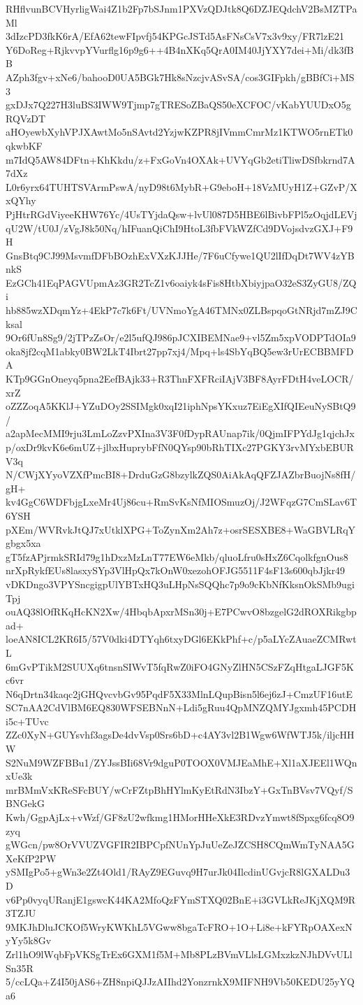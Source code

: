 RHflvunBCVHyrligWai4Z1b2Fp7bSJnm1PXVzQDJtk8Q6DZJEQdchV2BsMZTPaMl
3dIzcPD3fkK6rA/EfA62tewFIpvfj54KPGcJSTd5AsFNsCsV7x3v9xy/FR7lzE21
Y6DoReg+RjkvvpYVurflg16p9g6++4B4nXKq5QrA0IM40JjYXY7dei+Mi/dk3fBB
AZph3fgv+xNe6/bahooD0UA5BGk7Hk8sNzcjvASvSA/cos3GIFpkh/gBBfCi+MS3
gxDJx7Q227H3luBS3IWW9Tjmp7gTRESoZBaQS50eXCFOC/vKabYUUDxO5gRQVzDT
aHOyewbXyhVPJXAwtMo5nSAvtd2YzjwKZPR8jIVmmCmrMz1KTWO5rnETk0qkwbKF
m7IdQ5AW84DFtn+KhKkdu/z+FxGoVn4OXAk+UVYqGb2etiTliwDSfbkrnd7A7dXz
L0r6yrx64TUHTSVArmPswA/nyD98t6MybR+G9eboH+18VzMUyH1Z+GZvP/XxQYhy
PjHtrRGdViyeeKHW76Yc/4UsTYjdaQsw+lvUl087D5HBE6lBivbFPl5zOqjdLEVj
qU2W/tU0J/zVgJ8k50Nq/hIFuanQiChI9HtoL3fbFVkWZfCd9DVojsdvzGXJ+F9H
GnsBtq9CJ99MsvmfDFbBOzhExVXzKJJHe/7F6uCfywe1QU2lIfDqDt7WV4zYBnkS
EzGCh41EqPAGVUpmAz3GR2TcZ1v6oaiyk4sFis8HtbXbiyjpaO32eS3ZyGU8/ZQi
hb885wzXDqmYz+4EkP7c7k6Ft/UVNmoYgA46TMNx0ZLBspqoGtNRjd7mZJ9Cksal
9Or6fUn8Sg9/2jTPzZsOr/e2l5ufQJ986pJCXIBEMNae9+vl5Zm5xpVODPTdOIa9
oka8jf2cqM1abky0BW2LkT4Ibrt27pp7xj4/Mpq+ls4SbYqBQ5ew3rUrECBBMFDA
KTp9GGnOneyq5pna2EefBAjk33+R3ThnFXFRciIAjV3BF8AyrFDtH4veLOCR/xrZ
oZZZoqA5KKlJ+YZuDOy2SSIMgk0xqI21iphNpsYKxuz7EiEgXIfQIEeuNySBtQ9/
a2apMecMMI9rju3LmLoZzvPXIna3V3F0fDypRAUnap7ik/0QjmIFPYdJg1qjchJx
p/oxDr9kvK6e6mUZ+jlbxHuprybFfN0QYsp90bRhTIXc27PGKY3rvMYxbEBURV3q
N/CWjXYyoVZXfPmcBI8+DrduGzG8bzylkZQS0AiAkAqQFZJAZbrBuojNs8fH/gH+
kv4GgC6WDFbjgLxeMr4Uj86cu+RmSvKsNfMIOSmuzOj/J2WFqzG7CmSLav6T6YSH
pXEm/WVRvkJtQJ7xUtklXPG+ToZynXm2Ah7z+osrSESXBE8+WaGBVLRqYgbgx5xa
gT5fzAPjrmkSRId79g1hDxzMzLnT77EW6eMkb/qluoLfru0sHxZ6CqolkfgnOus8
nrXpRykfEUs8lasxySYp3VlHpQx7kOnW0xezohOFJG5511F4sF13s600qbJjkr49
vDKDngo3VPYSncgigpUlYBTxHQ3uLHpNsSQQhc7p9o9cKbNfKksnOkSMb9ugiTpj
ouAQ38lOfRKqHcKN2Xw/4HbqbApxrMSn30j+E7PCwvO8bzgelG2dROXRikgbpad+
loeAN8ICL2KR6I5/57V0dki4DTYqh6txyDGl6EKkPhf+c/p5aLYcZAuaeZCMRwtL
6mGvPTikM2SUUXq6tnsnSIWvT5fqRwZ0iFO4GNyZlHN5CSzFZqHtgaLJGF5Kc6vr
N6qDrtn34kaqc2jGHQvcvbGv95PqdF5X33MlnLQupBisn5l6ej6zJ+CmzUF16utE
SC7nAA2CdVlBM6EQ830WFSEBNnN+Ldi5gRuu4QpMNZQMYJgxmh45PCDHi5c+TUvc
ZZc0XyN+GUYsvhf3agsDe4dvVsp0Srs6bD+c4AY3vl2B1Wgw6WfWTJ5k/iljcHHW
S2NuM9WZFBBu1/ZYJssBIi68Vr9dguP0TOOX0VMJEaMhE+Xl1aXJEEl1WQnxUe3k
mrBMmVxKReSFcBUY/wCrFZtpBhHYlmKyEtRdN3IbzY+GxTnBVsv7VQyf/SBNGekG
Kwh/GgpAjLx+vWzf/GF8zU2wfkmg1HMorHHeXkE3RDvzYmwt8fSpxg6fcq8O9zyq
gWGcn/pw8OrVVUZVGFIR2IBPCpfNUnYpJuUeZeJZCSH8CQmWmTyNAA5GXeKfP2PW
ySMIgPo5+gWn3e2Zt4Old1/RAyZ9EGuvq9H7urJk04IlcdinUGvjcR8lGXALDu3D
v6Pp0vyqURanjE1gswcK44KA2MfoQzFYmSTXQ02BnE+i3GVLkReJKjXQM9R3TZJU
9MKJhDluJCKOf5WryKWKhL5VGww8bgaTcFRO+1O+Li8e+kFYRpOAXexNyYy5k8Gv
Zrl1hO9lWqbFpVKSgTrEx6GXM1f5M+Mb8PLzBVmVLlsLGMxzkzNJhDVvULlSn35R
5/ccLQa+Z4I50jAS6+ZH8npiQJJzAIIhd2YonzrnkX9MIFNH9Vb50KEDU25yYQa6
